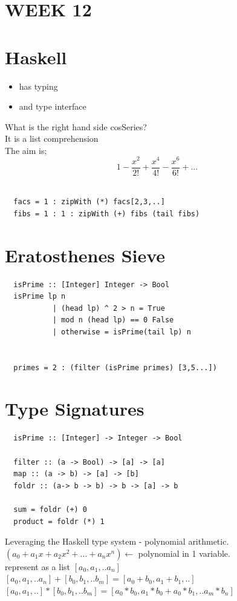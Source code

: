 \documentclass{article}
\begin{document}
\begin{flushleft}
 \section*{WEEK 12}
 \section*{Haskell}
\begin{flushleft}
 \begin{itemize}
  \item has typing
  \item and type interface
 \end{itemize}
 What is the right hand side cosSeries?\\
 It is a list comprehension\\
 \bigskip
 The aim is;\\
 $$1 -\frac{x^2}{2!} + \frac{x^4}{4!} - \frac{x^6}{6!} + ...$$\\
 \begin{verbatim}
  facs = 1 : zipWith (*) facs[2,3,..]
  fibs = 1 : 1 : zipWith (+) fibs (tail fibs)
 \end{verbatim}
\end{flushleft}

\section*{Eratosthenes Sieve}
\begin{flushleft}
 \begin{verbatim}
  isPrime :: [Integer] Integer -> Bool
  isPrime lp n 
           | (head lp) ^ 2 > n = True
           | mod n (head lp) == 0 False
           | otherwise = isPrime(tail lp) n
 
  
  primes = 2 : (filter (isPrime primes) [3,5...])
 \end{verbatim}
\end{flushleft}

\section*{Type Signatures}
\begin{flushleft}
 \begin{verbatim}
  isPrime :: [Integer] -> Integer -> Bool
  
  filter :: (a -> Bool) -> [a] -> [a]
  map :: (a -> b) -> [a] -> [b]
  foldr :: (a-> b -> b) -> b -> [a] -> b
  
  sum = foldr (+) 0
  product = foldr (*) 1
 \end{verbatim}
 Leveraging the Haskell type system - polynomial arithmetic.\\
 $(a_0 + a_1x + a_2x^2 + ... + a_nx^n) \leftarrow$ polynomial in 1 variable.\\
 represent as a list $[a_0, a_1, .. a_n]$\\
 $[a_0, a_1, .. a_n] + [b_0, b_1, .. b_m] = [a_0 + b_0, a_1 + b_1, ..]$\\
 $[a_0, a_1, ..] * [b_0, b_1, .. b_m] = [a_0 * b_0, a_1 * b_0 + a_0 * b_1, .. a_m * b_n]$
\end{flushleft}
\end{flushleft}
\end{document}
